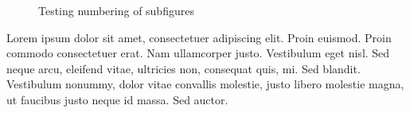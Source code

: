 \documentclass{article}
\begin{document}
\begin{figure}[h]
\begin{center}
\quad
{}\quad
{}
\end{center}
\caption{Testing numbering of subfigures}
\end{figure} 

Lorem ipsum dolor sit amet, consectetuer adipiscing elit. Proin euismod.
Proin commodo consectetuer erat. Nam ullamcorper justo. Vestibulum eget
nisl. Sed neque arcu, eleifend vitae, ultricies non, consequat quis, mi.
Sed blandit. Vestibulum nonummy, dolor vitae convallis molestie, justo
libero molestie magna, ut faucibus justo neque id massa. Sed auctor.
\end{document}
